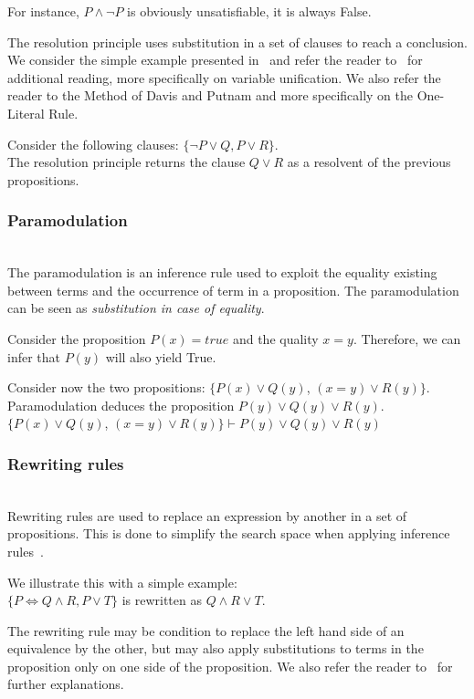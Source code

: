 For instance, $P \wedge \neg P$ is obviously unsatisfiable, \ie it is always False.

The resolution principle uses substitution in a set of clauses to reach a conclusion.
We consider the simple example presented in~\cite{snark-Stickel2000} and refer the reader to~\cite{symbolic-proof} for additional reading, more specifically on variable unification.
We also refer the reader to the Method of Davis and Putnam and more specifically on the One-Literal Rule.

Consider the following clauses: $\{\neg P \vee Q,P \vee R\}$.\\
The resolution principle returns the clause $Q \vee R$ as a resolvent of the previous propositions.


\subsubsection{Paramodulation}\textbf{\\}
The paramodulation is an inference rule used to exploit the equality existing between terms and the occurrence of term in a proposition. The paramodulation can be seen as \textit{substitution in case of equality}.

Consider the proposition $P(x) = true$ and the quality $x=y$. Therefore, we can infer that $P(y)$ will also yield True.

Consider now the two propositions: $\{P(x) \vee Q(y)$, $(x = y) \vee R(y)\}$.\\
Paramodulation deduces the proposition $P(y) \vee Q(y) \vee R(y)$.\\
$\{P(x) \vee Q(y)$, $(x = y) \vee R(y)\} \vdash P(y) \vee Q(y) \vee R(y)$

\subsubsection{Rewriting rules}\textbf{\\}
Rewriting rules are used to replace an expression by another in a set of propositions.
This is done to simplify the search space when applying inference rules~\cite{snark-Stickel2000}.

We illustrate this with a simple example:\\
$\{P \Leftrightarrow Q \wedge R, P \vee T\}$ is rewritten as $Q \wedge R \vee T$. 

The rewriting rule may be condition to replace the left hand side of an equivalence by the other, but may also apply substitutions to terms in the proposition only on one side of the proposition.
We also refer the reader to~\cite{snark-Stickel2000,symbolic-proof} for further explanations.
